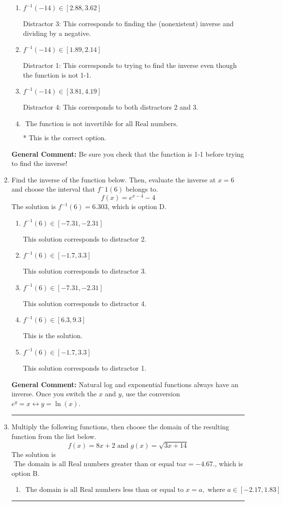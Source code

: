 \documentclass{extbook}[14pt]
\newcommand{\litem}[1]{\item #1

\rule{\textwidth}{0.4pt}}
\begin{document}
\begin{enumerate}
{\begin{enumerate}[label=\Alph*.]
 Distractor 2: This corresponds to finding the (nonexistent) inverse and not subtracting by the vertical shift.
\item \( f^{-1}(-14) \in [2.88, 3.62] \)

 Distractor 3: This corresponds to finding the (nonexistent) inverse and dividing by a negative.
\item \( f^{-1}(-14) \in [1.89, 2.14] \)

 Distractor 1: This corresponds to trying to find the inverse even though the function is not 1-1. 
\item \( f^{-1}(-14) \in [3.81, 4.19] \)

 Distractor 4: This corresponds to both distractors 2 and 3.
\item \( \text{ The function is not invertible for all Real numbers. } \)

* This is the correct option.
\end{enumerate}

\textbf{General Comment:} Be sure you check that the function is 1-1 before trying to find the inverse!
}
\litem{
Find the inverse of the function below. Then, evaluate the inverse at $x = 6$ and choose the interval that $f^-1(6)$ belongs to.
\[ f(x) = e^{x-4}-4 \]The solution is \( f^{-1}(6) = 6.303 \), which is option D.\begin{enumerate}[label=\Alph*.]
\item \( f^{-1}(6) \in [-7.31, -2.31] \)

 This solution corresponds to distractor 2.
\item \( f^{-1}(6) \in [-1.7, 3.3] \)

 This solution corresponds to distractor 3.
\item \( f^{-1}(6) \in [-7.31, -2.31] \)

 This solution corresponds to distractor 4.
\item \( f^{-1}(6) \in [6.3, 9.3] \)

 This is the solution.
\item \( f^{-1}(6) \in [-1.7, 3.3] \)

 This solution corresponds to distractor 1.
\end{enumerate}

\textbf{General Comment:} Natural log and exponential functions always have an inverse. Once you switch the $x$ and $y$, use the conversion $ e^y = x \leftrightarrow y=\ln(x)$.
}
\litem{
Multiply the following functions, then choose the domain of the resulting function from the list below.
\[ f(x) = 8x + 2 \text{ and } g(x) = \sqrt{3x+14}  \]The solution is \( \text{ The domain is all Real numbers greater than or equal to} x = -4.67. \), which is option B.\begin{enumerate}[label=\Alph*.]
\item \( \text{ The domain is all Real numbers less than or equal to } x = a, \text{ where } a \in [-2.17, 1.83] \)



\end{enumerate}}
\end{enumerate}
\end{document}
